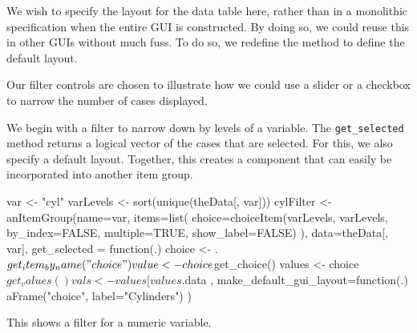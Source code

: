 \documentclass{article}
\newcommand{\code}[1]{\texttt{#1}} %
\begin{document}
We wish to specify the layout for the data table here, rather than in
a monolithic specification when the entire GUI is constructed. By
doing so, we could reuse this in other GUIs without much fuss. To do
so, we redefine the method to define the default layout.
\begin{Schunk}
\end{Schunk}


Our filter controls are chosen to illustrate how we could use a slider
or a checkbox to narrow the number of cases displayed.  

We begin with a filter to narrow down by levels of a variable. The
\code{get\_selected} method returns a logical vector of the cases that
are selected.  For this, we also specify a default layout. Together,
this creates a component that can easily be incorporated into another
item group.
\begin{Schunk}
\begin{Sinput}
 var <- "cyl"
 varLevels <- sort(unique(theData[, var]))
 cylFilter <- anItemGroup(name=var,
                          items=list(
                            choice=choiceItem(varLevels, varLevels,
                              by_index=FALSE, multiple=TRUE, show_label=FALSE)
                            ),
                          data=theData[, var],
                          get_selected = function(.) {
                            choice <- .$get_item_by_name("choice")
                            value <- choice$get_choice()
                            values <- choice$get_values()
                            vals <- values[values %
                            .$data %
                          },
                          make_default_gui_layout=function(.) {
                            aFrame("choice", label="Cylinders")
                         })
\end{Sinput}
\end{Schunk}

This shows a filter for a numeric variable.
\begin{Schunk}
\end{Schunk}
\end{document}
